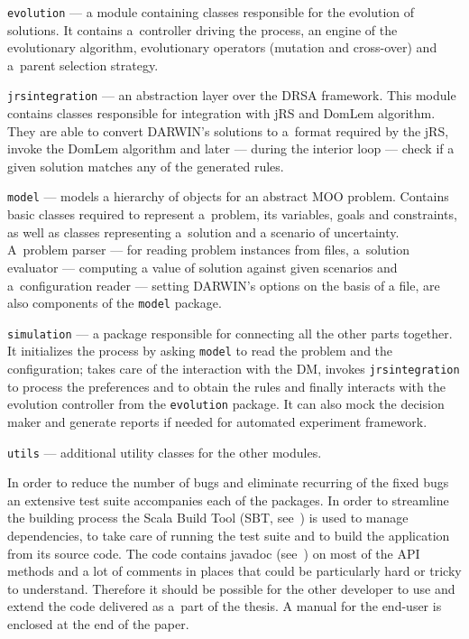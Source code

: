 \begin{description}
  \item{\texttt{evolution}} --- a module containing classes responsible for
    the evolution of solutions. It contains a~controller driving the process,
    an engine of the evolutionary algorithm, evolutionary operators (mutation
    and cross-over) and a~parent selection strategy.

  \item{\texttt{jrsintegration}} --- an abstraction layer over the DRSA
    framework. This module contains classes responsible for integration with
    jRS and DomLem algorithm. They are able to convert DARWIN's solutions to
    a~format required by the jRS, invoke the DomLem algorithm and later ---
    during the interior loop --- check if a given solution matches any of the
    generated rules.

  \item{\texttt{model}} --- models a hierarchy of objects for an abstract MOO
    problem. Contains basic classes required to represent a~problem, its
    variables, goals and constraints, as well as classes representing
    a~solution and a scenario of uncertainty. A~problem parser --- for reading
    problem instances from files, a~solution evaluator --- computing a value
    of solution against given scenarios and a~configuration reader --- setting
    DARWIN's options on the basis of a file, are also components of the
    \texttt{model} package.
  \item{\texttt{simulation}} --- a package responsible for connecting all the
    other parts together. It initializes the process by asking \texttt{model}
    to read the problem and the configuration; takes care of the interaction
    with the DM, invokes \texttt{jrsintegration} to process the preferences
    and to obtain the rules and finally interacts with the evolution
    controller from the \texttt{evolution} package. It can also mock the
    decision maker and generate reports if needed for automated experiment
    framework.

  \item{\texttt{utils}} --- additional utility classes for the other modules.
\end{description}

In order to reduce the number of bugs and eliminate recurring of the fixed
bugs an extensive test suite accompanies each of the packages. In order to
streamline the building process the Scala Build Tool (SBT, see~\cite{sbt10})
is used to manage dependencies, to take care of running the test suite and to
build the application from its source code. The code contains javadoc
(see~\cite{JavaDoc}) on most of the API methods and a lot of comments in
places that could be particularly hard or tricky to understand. Therefore it
should be possible for the other developer to use and extend the code
delivered as a~part of the thesis. A manual for the end-user is enclosed at
the end of the paper.

